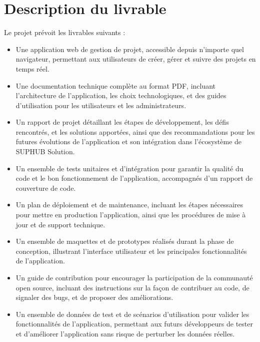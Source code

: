 \section{Description du livrable}

Le projet prévoit les livrables suivants :

\begin{itemize}
  \item Une application web de gestion de projet, accessible depuis n'importe quel navigateur, permettant aux utilisateurs de créer, gérer et suivre des projets en temps réel.
  \item Une documentation technique complète au format PDF, incluant l'architecture de l'application, les choix technologiques, et des guides d'utilisation pour les utilisateurs et les administrateurs.
  \item Un rapport de projet détaillant les étapes de développement, les défis rencontrés, et les solutions apportées, ainsi que des recommandations pour les futures évolutions de l'application et son intégration dans l'écosystème de SUPHUB Solution.
  \item Un ensemble de tests unitaires et d'intégration pour garantir la qualité du code et le bon fonctionnement de l'application, accompagnés d'un rapport de couverture de code.
  \item Un plan de déploiement et de maintenance, incluant les étapes nécessaires pour mettre en production l'application, ainsi que les procédures de mise à jour et de support technique.
  \item Un ensemble de maquettes et de prototypes réalisés durant la phase de conception, illustrant l'interface utilisateur et les principales fonctionnalités de l'application.
  \item Un guide de contribution pour encourager la participation de la communauté open source, incluant des instructions sur la façon de contribuer au code, de signaler des bugs, et de proposer des améliorations.
  \item Un ensemble de données de test et de scénarios d'utilisation pour valider les fonctionnalités de l'application, permettant aux futurs développeurs de tester et d'améliorer l'application sans risque de perturber les données réelles.
\end{itemize}
